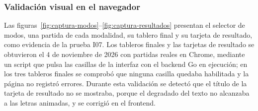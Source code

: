 \documentclass[12pt,a4paper]{article}
\begin{document}
\subsubsection{Validación visual en el navegador}
Las figuras~\ref{fig:captura-modos}--\ref{fig:captura-resultados} presentan el selector
de modos, una partida de cada modalidad, su tablero final y su tarjeta de resultado, como
evidencia de la prueba I07. Los tableros finales y las tarjetas de resultado se obtuvieron
el 4 de noviembre de 2026 con partidas reales en Chrome, mediante un script que pulsa las
casillas de la interfaz con el backend Go en ejecución; en los tres tableros finales se
comprobó que ninguna casilla quedaba habilitada y la página no registró errores.
Durante esta validación se detectó que el título de la tarjeta de resultado no se mostraba,
porque el degradado del texto no alcanzaba a las letras animadas, y se corrigió en el frontend.
\end{document}
